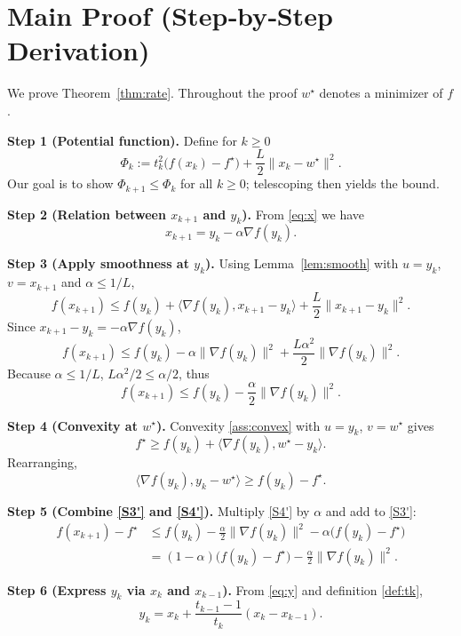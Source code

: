 \documentclass{article}
\newcommand{\grad}{\nabla}
\begin{document}
\section*{Main Proof (Step‑by‑Step Derivation)}
We prove Theorem~\ref{thm:rate}. Throughout the proof $w^\star$ denotes a minimizer of $f$.

\noindent\textbf{Step 1 (Potential function).}  
Define for $k\ge0$
\[
\Phi_k := t_k^2\bigl(f(x_k)-f^\star\bigr)+\frac{L}{2}\|x_k-w^\star\|^2 .
\tag{P1}
\]
Our goal is to show $\Phi_{k+1}\le \Phi_k$ for all $k\ge0$; telescoping then yields the bound.

\noindent\textbf{Step 2 (Relation between $x_{k+1}$ and $y_k$).}  
From \eqref{eq:x} we have
\[
x_{k+1}=y_k-\alpha\grad f(y_k).
\tag{S2}
\]

\noindent\textbf{Step 3 (Apply smoothness at $y_k$).}  
Using Lemma~\ref{lem:smooth} with $u=y_k$, $v=x_{k+1}$ and $\alpha\le 1/L$,
\[
f(x_{k+1})\le f(y_k)+\langle\grad f(y_k),x_{k+1}-y_k\rangle+\frac{L}{2}\|x_{k+1}-y_k\|^2 .
\]
Since $x_{k+1}-y_k=-\alpha\grad f(y_k)$,
\[
f(x_{k+1})\le f(y_k)-\alpha\|\grad f(y_k)\|^2+\frac{L\alpha^{2}}{2}\|\grad f(y_k)\|^2 .
\tag{S3}
\]
Because $\alpha\le 1/L$, $L\alpha^{2}/2\le \alpha/2$, thus
\[
f(x_{k+1})\le f(y_k)-\frac{\alpha}{2}\|\grad f(y_k)\|^2 .
\tag{S3'}
\]

\noindent\textbf{Step 4 (Convexity at $w^\star$).}  
Convexity \eqref{ass:convex} with $u=y_k$, $v=w^\star$ gives
\[
f^\star\ge f(y_k)+\langle\grad f(y_k),w^\star-y_k\rangle .
\tag{S4}
\]
Rearranging,
\[
\langle\grad f(y_k),y_k-w^\star\rangle\ge f(y_k)-f^\star .
\tag{S4'}
\]

\noindent\textbf{Step 5 (Combine \eqref{S3'} and \eqref{S4'}).}  
Multiply \eqref{S4'} by $\alpha$ and add to \eqref{S3'}:
\[
\begin{aligned}
f(x_{k+1})-f^\star
&\le f(y_k)-\frac{\alpha}{2}\|\grad f(y_k)\|^2 -\alpha\bigl(f(y_k)-f^\star\bigr) \\
&= (1-\alpha)\bigl(f(y_k)-f^\star\bigr)-\frac{\alpha}{2}\|\grad f(y_k)\|^2 .
\end{aligned}
\tag{S5}
\]

\noindent\textbf{Step 6 (Express $y_k$ via $x_k$ and $x_{k-1}$).}  
From \eqref{eq:y} and definition \eqref{def:tk},
\[
y_k = x_k + \frac{t_{k-1}-1}{t_k}(x_k-x_{k-1}) .
\tag{S6}
\]
\end{document}
